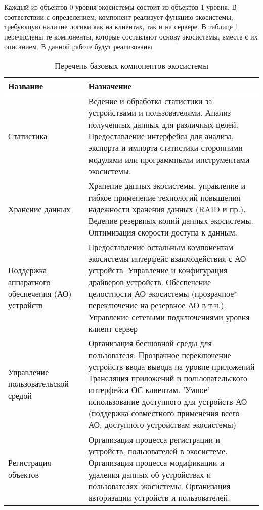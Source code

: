 Каждый из объектов 0 уровня экосистемы состоит из объектов 1 уровня.
В соответствии с определением, компонент реализует функцию экосистемы, требующую наличие логики как на клиентах, так и на сервере. В таблице \ref{table-components} перечислены те компоненты, которые составляют основу экосистемы, вместе с их описанием. В данной работе будут реализованы 
\begin{table}[ht]
   \centering
   \begin{tabularx}{\textwidth}{|>{\centering}p{}|X|}
      \cline{1-2}
      Название & Назначение \\
      \hline
      Статистика & Ведение и обработка статистики за устройствами и пользователями. Анализ полученных данных для различных целей. Предоставление интерфейса для анализа, экспорта и импорта статистики сторонними модулями или программными инструментами экосистемы. \\
      \hline
      Хранение данных & Хранение данных экосистемы, управление и гибкое применение технологий повышения надежности хранения данных (RAID и пр.). Ведение резервных копий данных экосистемы. Оптимизация скорости доступа к данным. \\
      \hline
      Поддержка аппаратного обеспечения (АО) устройств & Предоставление остальным компонентам экосистемы интерфейс взаимодействия с АО устройств. Управление и конфигурация драйверов устройств. Обеспечение целостности АО экосистемы (прозрачное* переключение на резервное АО в т.ч.). Управление сетевыми подключениями уровня клиент-сервер \\
      \hline
      Управление пользовательской средой & Организация бесшовной среды для пользователя:
      Прозрачное переключение устройств ввода-вывода на уровне приложений
      Трансляция приложений и пользовательского интерфейса ОС клиентам.
      'Умное' использование доступного для устройств АО (поддержка совместного применения всего АО, доступного устройствам экосистемы) \\
      \hline
      Регистрация объектов & Организация процесса регистрации и устройств, пользователей в экосистеме. Организация процесса модификации и удаления данных об устройствах и пользователях экосистемы. Организация авторизации устройств и пользователей. \\
      \hline
   \end{tabularx}
   \caption{Перечень базовых компонентов экосистемы}
   \label{table-components}
\end{table}
